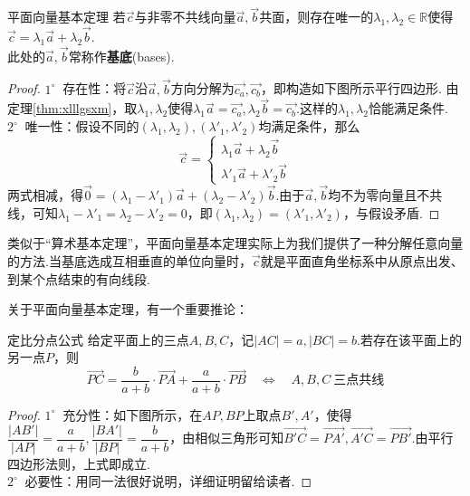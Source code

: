 \documentclass[lang=cn, zihao=5]{elegantbook}
\newcommand{\xl}[1]{\overrightarrow{#1}}
\newcommand{\R}{\mathbb{R}}
\newcommand{\buzhou}[1]{$#1^{\circ} \ $}
\begin{document}
\begin{theorem}{平面向量基本定理}
	若$\vec{c}$与非零不共线向量$\vec{a},\vec{b}$共面，则存在唯一的$\lambda _1,\lambda _2 \in \R$使得$\vec{c} = \lambda _1 \vec{a} + \lambda _2 \vec{b}$. \\
	此处的$\vec{a},\vec{b}$常称作\textbf{基底}(bases).
\end{theorem}
\begin{proof}
	\buzhou{1} 存在性：将$\vec{c}$沿$\vec{a},\vec{b}$方向分解为$\vec{c_a},\vec{c_b}$，即构造如下图所示平行四边形.
	由定理\ref{thm:xlllgsxm}，取$\lambda _1,\lambda _2$使得$\lambda _1 \vec{a}=\vec{c_a}, \lambda _2 \vec{b}=\vec{c_b}$.这样的$\lambda _1,\lambda _2$恰能满足条件. \\
	\buzhou{2} 唯一性：假设不同的$(\lambda _1, \lambda _2),(\lambda '_1, \lambda '_2)$均满足条件，那么$$\vec{c}=\begin{cases}
		\lambda _1 \vec{a} + \lambda _2 \vec{b} \\
		\lambda '_1 \vec{a} + \lambda '_2 \vec{b}
	\end{cases}$$
	两式相减，得$\vec{0}=(\lambda _1 - \lambda '_1) \vec{a} + (\lambda _2 - \lambda '_2) \vec{b}$.由于$\vec{a},\vec{b}$均不为零向量且不共线，可知$\lambda _1 - \lambda '_1 = \lambda _2 - \lambda '_2 = 0$，即$(\lambda _1, \lambda _2)=(\lambda '_1, \lambda '_2)$，与假设矛盾.
\end{proof}

类似于“算术基本定理”，平面向量基本定理实际上为我们提供了一种分解任意向量的方法.当基底选成互相垂直的单位向量时，$\vec{c}$就是平面直角坐标系中从原点出发、到某个点结束的有向线段.

关于平面向量基本定理，有一个重要推论：

\begin{corollary}{定比分点公式}
	给定平面上的三点$A,B,C$，记$|AC|=a,|BC|=b$.若存在该平面上的另一点$P$，则$$\xl{PC} = \frac{b}{a+b} \cdot \xl{PA} + \frac{a}{a+b} \cdot \xl{PB} \quad \Longleftrightarrow \quad A,B,C~\textit{三点共线}$$
\end{corollary}
\begin{proof}
	\buzhou{1} 充分性：如下图所示，在$AP,BP$上取点$B',A'$，使得$\dfrac{|AB'|}{|AP|}=\dfrac{a}{a+b},\dfrac{|BA'|}{|BP|}=\dfrac{b}{a+b}$，由相似三角形可知$\xl{B'C}=\xl{PA'},\xl{A'C}=\xl{PB'}$.由平行四边形法则，上式即成立. \\
	\buzhou{2} 必要性：用同一法很好说明，详细证明留给读者.
\end{proof}
\end{document}
